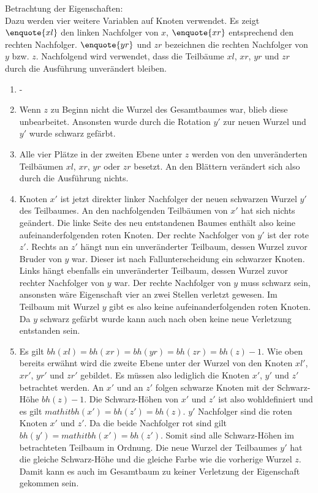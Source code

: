 \documentclass[a4paper,12pt]{article}
\begin{document}
Betrachtung der Eigenschaften:\\
\noindent Dazu werden vier weitere Variablen auf Knoten verwendet. Es zeigt $\enquote{xl}$ den linken Nachfolger von $x$,  $\enquote{xr}$ entsprechend den rechten Nachfolger. $\enquote{yr}$ und $zr$ bezeichnen die rechten Nachfolger von $y$ bzw. $z$. Nachfolgend wird verwendet, dass die Teilbäume $xl$, $xr$, $yr$ und $zr$ durch die Ausführung unverändert bleiben.
\begin{enumerate}
	\item -
	\item Wenn $z$ zu Beginn nicht die Wurzel des Gesamtbaumes war, blieb diese unbearbeitet. Ansonsten wurde durch die Rotation $y'$ zur neuen Wurzel und $y'$ wurde schwarz gefärbt. 
	\item  Alle vier Plätze in der zweiten Ebene unter $z$ werden von den unveränderten Teilbäumen $xl$, $xr$, $yr$ oder $zr$ besetzt. An den Blättern verändert sich also durch die Ausführung nichts.
	\item  Knoten $x'$ ist jetzt direkter linker Nachfolger der neuen schwarzen Wurzel $y'$ des Teilbaumes. An den nachfolgenden Teilbäumen von $x'$ hat sich nichts geändert. Die linke Seite des neu entstandenen Baumes enthält also keine aufeinanderfolgenden roten Knoten. Der rechte Nachfolger von $y'$ ist der rote $z'$. Rechts an $z'$ hängt nun ein unveränderter Teilbaum, dessen Wurzel zuvor Bruder von $y$ war. Dieser ist nach Fallunterscheidung ein schwarzer Knoten. Links hängt ebenfalls ein unveränderter Teilbaum, dessen Wurzel zuvor rechter Nachfolger von $y$ war. Der rechte Nachfolger von $y$ muss schwarz sein, ansonsten wäre Eigenschaft vier an zwei Stellen verletzt gewesen. Im Teilbaum mit Wurzel $y$ gibt es also keine aufeinanderfolgenden roten Knoten. Da $y$ schwarz gefärbt wurde kann auch nach oben keine neue Verletzung entstanden sein.  
	\item  Es gilt  $\mathit{bh(xl)} = \mathit{bh(xr)} = \mathit{bh(yr)} =  \mathit{bh(zr)} = \mathit{bh(z)} - 1$. Wie oben bereits erwähnt wird die zweite Ebene unter der Wurzel von den Knoten $\mathit{xl'}$, $\mathit{xr'}$, $\mathit{yr'}$ und $\mathit{zr'}$ gebildet. Es müssen also lediglich die Knoten $x'$, $y'$ und $z'$ betrachtet werden. An $x'$ und an $z'$ folgen schwarze Knoten mit der Schwarz-Höhe $\mathit{bh(z)} - 1$. Die Schwarz-Höhen von $x'$ und $z'$ ist also wohldefiniert und es gilt $mathit{bh(x')} = \mathit{bh(z')} = \mathit{bh(z)}$. $y'$ Nachfolger sind die roten Knoten $x'$ und $z'$. Da die beide Nachfolger rot sind gilt $\mathit{bh(y')} = mathit{bh(x')} = \mathit{bh(z')}$. Somit sind alle Schwarz-Höhen im betrachteten Teilbaum in Ordnung. Die neue Wurzel der Teilbaumes $y'$ hat die gleiche Schwarz-Höhe und die gleiche Farbe wie die vorherige Wurzel $z$. Damit kann es auch im Gesamtbaum zu keiner Verletzung der Eigenschaft gekommen sein.
\end{enumerate} 
\end{document}
